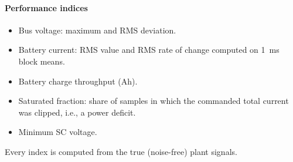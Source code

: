\paragraph{Performance indices}
\begin{itemize}
\item Bus voltage: maximum and RMS deviation.
\item Battery current: RMS value and RMS rate of change computed on \SI{1}{ms} block means.
\item Battery charge throughput (Ah).
\item Saturated fraction: share of samples in which the commanded total current was clipped, i.e., a power deficit.
\item Minimum SC voltage.
\end{itemize}
Every index is computed from the true (noise-free) plant signals.
